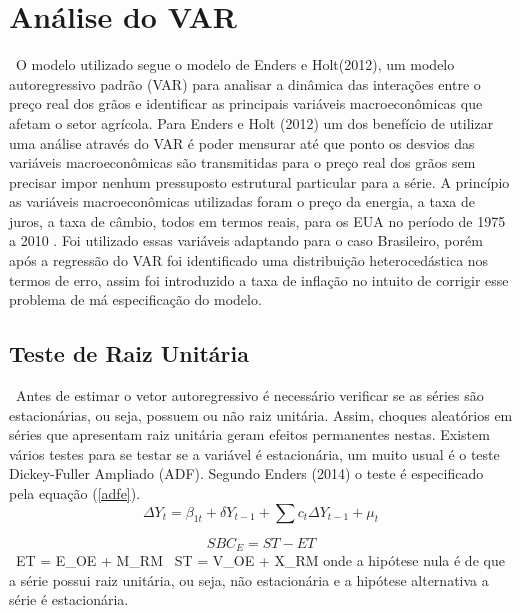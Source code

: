 \documentclass[a4paper,12pt,oneside,titlepage]{article}
\begin{document}
         


\section{Análise do VAR}
\label{result}

\ O modelo utilizado segue o modelo de Enders e Holt(2012), um modelo autoregressivo padrão (VAR) para analisar a dinâmica das interações entre o preço real dos grãos e identificar as principais variáveis macroeconômicas que afetam o setor agrícola. Para Enders e Holt (2012) um dos benefício de utilizar uma análise através do VAR é poder mensurar até que ponto os desvios das variáveis macroeconômicas são transmitidas para o preço real dos grãos sem precisar impor nenhum pressuposto estrutural particular para a série. A princípio as variáveis macroeconômicas utilizadas foram o preço da energia, a taxa de juros, a taxa de câmbio, todos em termos reais, para os EUA no período de 1975 a 2010 . Foi utilizado essas variáveis adaptando para o caso Brasileiro, porém após a regressão do VAR foi identificado uma distribuição heterocedástica nos termos de erro, assim foi introduzido a taxa de inflação no intuito de corrigir esse problema de má especificação do modelo.    

\subsection{Teste de Raiz Unitária}

\ Antes de estimar o vetor autoregressivo é necessário verificar se as séries são estacionárias, ou seja, possuem ou não raiz unitária. Assim, choques aleatórios em séries que apresentam raiz unitária geram efeitos permanentes nestas. Existem vários testes para se testar se a variável é estacionária, um muito usual é o teste Dickey-Fuller Ampliado (ADF). Segundo Enders (2014) o teste é especificado pela equação (\eqref{adfe}). 
\begin{equation}
\label{adfe}
\Delta Y_t = \beta_{1t} + \delta Y_{t-1} + \sum c_t \Delta Y_{t-1} +\mu_t 
\end{equation}

\begin{equation}
\label{bc}

SBC_E = ST - ET
\end{equation}
\ ET = E_OE + M_RM
\ ST = V_OE + X_RM
onde a hipótese nula é de que a série possui raiz unitária, ou seja, não estacionária e a hipótese alternativa a série é estacionária.
\end{document}
